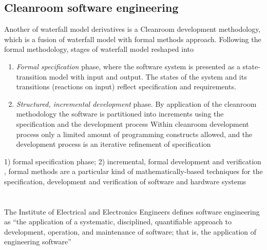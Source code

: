 \subsection{Cleanroom software engineering}
Another of waterfall model derivatives is a Cleanroom development methodology, which is
a fusion of waterfall model with formal methods approach. 
Following the formal methodology, stages of waterfall model reshaped into 
\begin{enumerate}
 \item \textit{Formal specification} phase, where the software system is presented as 
a state-transition model with input and output. The states of the system and
its transitions (reactions on input) reflect specification and requirements.
 \item \textit{Structured, incremental development} phase. By application of the 
cleanroom methodology the software is partitioned into increments using the 
specification and the development process Within cleanroom
development process only a limited amount of programming constructs allowed,
and the development process is an iterative refinement of specification
\end{enumerate}

1) formal specification phase; 2) incremental, formal development and verification 
, formal methods are a particular kind of mathematically-based techniques for
the specification, development and verification of software and hardware systems

\section{}

The Institute of Electrical and Electronics Engineers defines software engineering as 
“the application of a systematic, disciplined, quantifiable approach to development, 
operation, and maintenance of software; that is, the application of engineering software”
